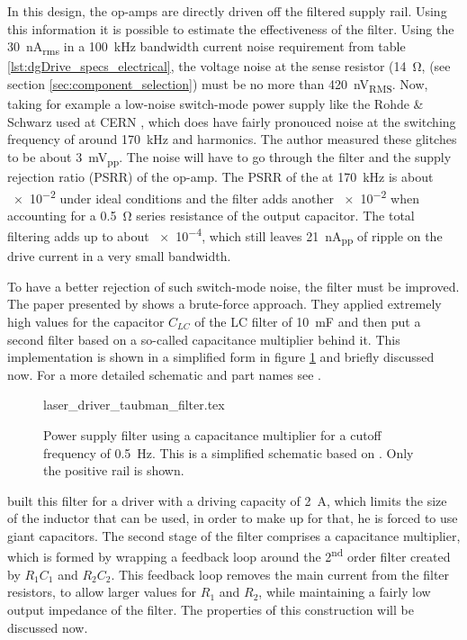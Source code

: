 In this design, the op-amps are directly driven off the filtered supply rail. Using this information it is possible to estimate the effectiveness of the filter. Using the \qty{30}{\nA_{rms}} in a \qty{100}{\kHz} bandwidth current noise requirement from table \ref{lst:dgDrive_specs_electrical}, the voltage noise at the sense resistor (\qty{14}{\ohm}, (see section \ref{sec:component_selection}) must be no more than \qty{420}{\nV_{RMS}}. Now, taking for example a low-noise switch-mode power supply like the Rohde \& Schwarz  used at CERN \cite{hmp4040_noise}, which does have fairly pronouced noise at the switching frequency of around \qty{170}{\kHz} and harmonics. The author measured these glitches to be about \qty{3}{\mV_{pp}}. The noise will have to go through the filter and the supply rejection ratio (PSRR) of the op-amp. The PSRR of the  at \qty{170}{\kHz} is about \num{e-2} under ideal conditions \cite{datasheet_LT1028} and the filter adds another \num{e-2} when accounting for a \qty{0.5}{\ohm} series resistance of the output capacitor. The total filtering adds up to about \num{e-4}, which still leaves \qty{21}{\nA_{pp}} of ripple on the drive current in a very small bandwidth.

To have a better rejection of such switch-mode noise, the filter must be improved. The paper presented by \citeauthor{laser_driver_qcl_taubman} \cite{laser_driver_qcl_taubman} shows a brute-force approach. They applied extremely high values for the capacitor $C_{LC}$ of the LC filter of \qty{10}{\milli\farad} and then put a second filter based on a so-called capacitance multiplier behind it. This implementation is shown in a simplified form in figure \ref{fig:laser_driver_taubman_filter} and briefly discussed now. For a more detailed schematic and part names see \cite{laser_driver_qcl_taubman}.

\begin{figure}[ht]
    \centering
        {laser_driver_taubman_filter.tex}
    \caption{Power supply filter using a capacitance multiplier for a cutoff frequency of \qty{0.5}{\Hz}. This is a simplified schematic based on \cite{laser_driver_qcl_taubman}. Only the positive rail is shown.}
    \label{fig:laser_driver_taubman_filter}
\end{figure}

\citeauthor{laser_driver_qcl_taubman} built this filter for a driver with a driving capacity of \qty{2}{\A}, which limits the size of the inductor that can be used, in order to make up for that, he is forced to use giant capacitors. The second stage of the filter comprises a capacitance multiplier, which is formed by wrapping a feedback loop around the 2\textsuperscript{nd} order filter created by $R_1 C_1$ and $R_2 C_2$. This feedback loop removes the main current from the filter resistors, to allow larger values for $R_1$ and $R_2$, while maintaining a fairly low output impedance of the filter. The properties of this construction will be discussed now.

